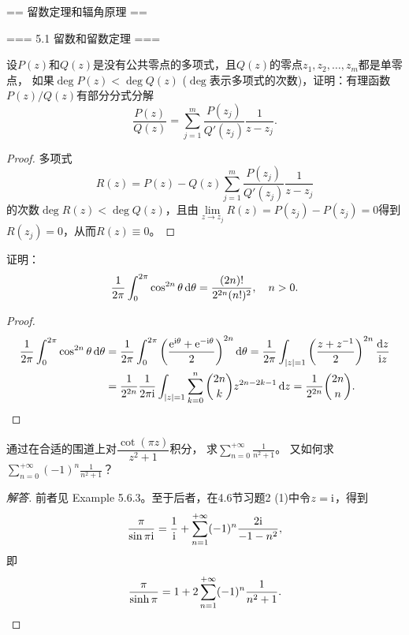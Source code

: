 == 留数定理和辐角原理 ==

=== 5.1 留数和留数定理 ===
\begin{3}
    设$P(z)$和$Q(z)$是没有公共零点的多项式，且$Q(z)$的零点$z_1,z_2,\dots,z_m$都是单零点，
    如果$\deg P(z)<\deg Q(z)$ ($\deg$表示多项式的次数)，证明：有理函数$P(z)/Q(z)$有部分分式分解
    \[\frac{P(z)}{Q(z)}=\sum_{j=1}^{m}\frac{P(z_j)}{Q'(z_j)}\frac{1}{z-z_j}.\]
\end{3}
\begin{proof}
    多项式\[R(z)=P(z)-Q(z)\sum_{j=1}^{m}\frac{P(z_j)}{Q'(z_j)}\frac{1}{z-z_j}\]
    的次数$\deg R(z)<\deg Q(z)$，且由$\lim\limits_{z \to z_j}R(z)=P(z_j)-P(z_j)=0$得到$R(z_j)=0$，从而$R(z)\equiv0$。
\end{proof}
\begin{9}
    证明：\[\frac{1}{2\pi}\int_0^{2\pi}\cos^{2n}\theta\,{\rm d}\theta
    =\frac{(2n)!}{2^{2n}(n!)^2}, \quad n>0.\]
\end{9}
\begin{proof}
\begin{align*}
    \frac{1}{2\pi}\int_0^{2\pi}\cos^{2n}\theta\,{\rm d}\theta
    &=\frac{1}{2\pi}\int_0^{2\pi}\left(\frac{{\rm e}^{{\rm i}\theta}+{\rm e}^{-{\rm i}\theta}}{2}\right)^{2n}{\rm d}\theta
    =\frac{1}{2\pi}\int_{|z|=1}\left(\frac{z+z^{-1}}{2}\right)^{2n}\frac{{\rm d}z}{{\rm i}z}\\
    &=\frac{1}{2^{2n}}\frac{1}{2\pi{\rm i}}\int_{|z|=1}\sum_{k=0}^{n}\binom{2n}{k}z^{2n-2k-1}\,{\rm d}z
    =\frac{1}{2^{2n}}\binom{2n}{n}.
\end{align*}
\end{proof}

\begin{11}
    通过在合适的围道上对$\dfrac{\cot(\pi z)}{z^2+1}$积分，
    求$\displaystyle\sum_{n=0}^{+\infty}\frac{1}{n^2+1}$。
    又如何求$\displaystyle\sum_{n=0}^{+\infty}(-1)^n\frac{1}{n^2+1}$？
\end{11}
\begin{proof}[解答]
    前者见\cite{AG} Example 5.6.3。至于后者，在4.6节习题2 (1)中令$z={\rm i}$，得到
    \[\frac{\pi}{\sin \pi{\rm i}}=\frac{1}{{\rm i}}
    +\sum_{n=1}^{+\infty}(-1)^n\frac{2{\rm i}}{-1-n^2},\]
    即
    \[\frac{\pi}{\sinh\pi}=1+2\sum_{n=1}^{+\infty}(-1)^n\frac{1}{n^2+1}.\qedhere\]
\end{proof}

